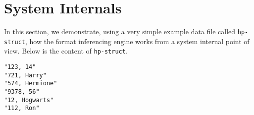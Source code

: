 \documentclass{sig-alternate-sigmod08}
\begin{document}



\begin {figure*}[tbh]
\begin{center}
\begin{minipage}[t]{0.5\columnwidth} 
\end{minipage}
\hfill
\begin{minipage}[t]{0.5\columnwidth}
\end{minipage}
\hfill
\begin{minipage}[t]{0.5\columnwidth}
\end{minipage}
\hfill
\begin{minipage}[t]{0.5\columnwidth}
\end{minipage}
\caption{Histograms from inferring hp-struct data (from left to right): 
(a) first iteration, (b) second iteration, (c) third iteration (context 1) 
and (d) third iteration (context 2)} \label{fig-hist}
\vspace*{-5mm}
\end{center}
\end{figure*}

\section{System Internals}
In this section, we demonstrate, using a very simple
example data file called {\tt hp-struct}, 
how the format inferencing engine works
from a system internal point of view.
Below is the content of {\tt hp-struct}.
{\small
\begin{verbatim}
"123, 14"
"721, Harry"
"574, Hermione"
"9378, 56"
"12, Hogwarts"
"112, Ron"
\end{verbatim}
}
\end{document}
